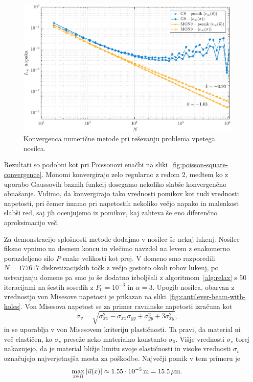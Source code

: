 \documentclass[12pt,a4paper,twoside]{article}
\theoremstyle{definition} %
\theoremstyle{plain} %
\numberwithin{equation}{section}
\newcommand{\vu}{\vec{u}}
\newcommand{\ts}{\sigma}
\newlength{\iw}
\begin{document}
\begin{figure}[h]
  \centering
  \includegraphics[width=\iw]{images/cantilever_beam_convergence.pdf}
  \caption{Konvergenca numerične metode pri reševanju problema vpetega nosilca.}
  \label{fig:cantilever-beam-convergence}
\end{figure}
Rezultati so podobni kot pri Poissonovi enačbi na sliki~\ref{fig:poisson-square-convergence}.
Monomi konvergirajo zelo regularno z redom $2$, medtem ko z uporabo Gaussovih baznih funkcij
dosegamo nekoliko slabše konvergenčno obnašanje. Vidimo, da konvergirajo tako vrednosti pomikov kot
tudi vrednosti napetosti, pri čemer imamo pri napetostih nekoliko večjo napako in malenkost slabši red,
saj jih ocenjujemo iz pomikov, kaj zahteva še eno diferenčno aproksimacijo več.

Za demonstracijo splošnosti metode dodajmo v nosilec še nekaj lukenj. Nosilec fiksno vpnimo na
desnem koncu in vlečimo navzdol na levem z enakomerno porazdeljeno silo $P$ enake velikosti kot
prej. V domeno smo razporedili $N = 177617$ diskretizacijskih točk z večjo gostoto okoli robov
lukenj, po ustvarjanju domene pa smo jo še dodatno izboljšali z algoritmom~\ref{alg:relax} s 50
iteracijami na šestih sosedih z $F_0 = 10^{-3}$ in $\alpha = 3$. Upogib nosilca, obarvan z
vrednostjo von Misesove napetosti je prikazan na sliki~\ref{fig:cantilever-beam-with-holes}.
Von Misesova napetost se za primer ravninske napetosti izračuna kot
\[
  \sigma_v = \sqrt{\sigma_{xx}^2-\sigma_{xx}\sigma_{yy}+\sigma_{yy}^2+3\sigma_{xy}^2},
\]
in se uporablja v von Misesovem kriteriju plastičnosti. Ta pravi, da material ni več
elastičen, ko $\sigma_v$ preseže neko materialno konstanto $\sigma_0$. Višje vrednosti $\ts_v$
torej nakazujejo, da je material bližje limitu svoje elastičnosti in visoke vrednosti $\ts_v$
označujejo najverjetnejša mesta za poškodbe. Največji pomik v tem primeru je
\begin{equation}
  \max_{x \in \Omega} |\vu(x)| \approx \unit[1.55 \cdot 10^{-5}]{m} = \unit[15.5]{\mu m}.
\end{equation}
\end{document}
